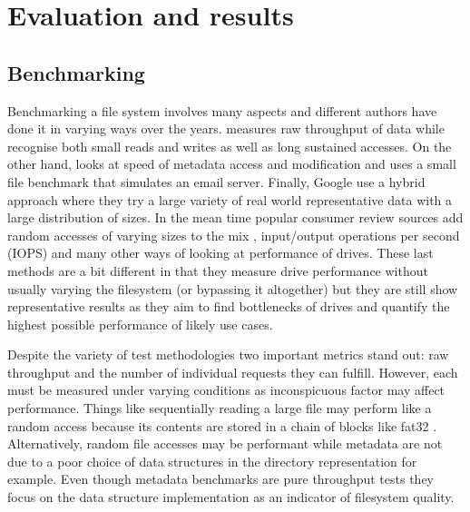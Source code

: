 \chapter{Evaluation and results}

    \section{Benchmarking}
        \label{sec:benchmark}

        Benchmarking a file system involves many aspects and different authors
        have done it in varying ways over the years.  measures
        raw throughput of data while  recognise both small
        reads and writes as well as long sustained accesses.  On the other
        hand,  looks at speed of metadata access and
        modification and  uses a small file
        benchmark that simulates an email server. Finally, Google use a hybrid
        approach where they try a large variety of real world representative
        data with a large distribution of sizes. In the mean time popular
        consumer review sources add random accesses of varying sizes to the mix
        \cite{servethehome_review}, input/output operations per second (IOPS)
        \cite{tomshardware_review} and many other ways of looking at
        performance of drives. These last methods are a bit different in that
        they measure drive performance without usually varying the filesystem
        (or bypassing it altogether) but they are still show representative
        results as they aim to find bottlenecks of drives and quantify the
        highest possible performance of likely use cases.

        Despite the variety of test methodologies two important metrics stand
        out: raw throughput and the number of individual requests they can
        fulfill. However, each must be measured under varying conditions as
        inconspicuous factor may affect performance. Things like sequentially
        reading a large file may perform like a random access because its
        contents are stored in a chain of blocks like fat32 \cite{fat32}.
        Alternatively, random file accesses may be performant while metadata
        are not due to a poor choice of data structures in the directory
        representation for example. Even though metadata benchmarks are pure
        throughput tests they focus on the data structure implementation as an
        indicator of filesystem quality.

